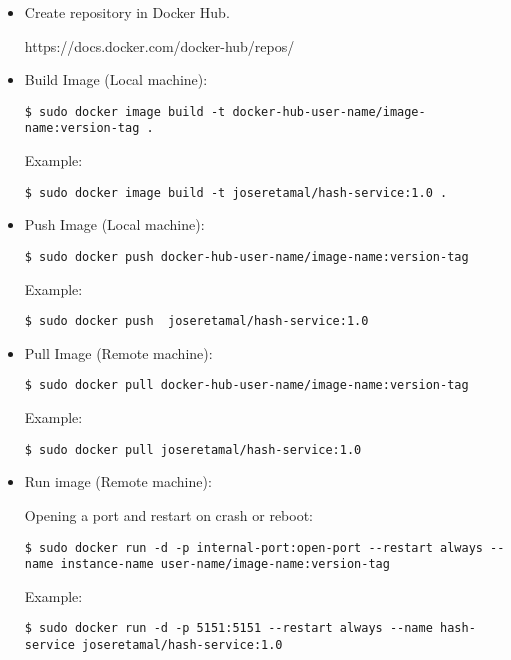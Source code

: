 \begin{itemize}
\item  Create repository in Docker Hub.

https://docs.docker.com/docker-hub/repos/
\item  Build Image (Local machine):
	
\begin{verbatim}
$ sudo docker image build -t docker-hub-user-name/image-name:version-tag .  
\end{verbatim}
Example:
\begin{verbatim}
$ sudo docker image build -t joseretamal/hash-service:1.0 . 
\end{verbatim}

\item  Push Image (Local machine):

\begin{verbatim}
$ sudo docker push docker-hub-user-name/image-name:version-tag
\end{verbatim}

Example:
\begin{verbatim}
$ sudo docker push  joseretamal/hash-service:1.0  
\end{verbatim}

\item  Pull Image (Remote machine):

\begin{verbatim}
$ sudo docker pull docker-hub-user-name/image-name:version-tag  
\end{verbatim}

Example:
\begin{verbatim}
$ sudo docker pull joseretamal/hash-service:1.0  
\end{verbatim}

\item  Run image (Remote machine):

\subitem Opening a port and restart on crash or reboot:
\begin{verbatim}
$ sudo docker run -d -p internal-port:open-port --restart always --name instance-name user-name/image-name:version-tag  
\end{verbatim}
Example:
\begin{verbatim}
$ sudo docker run -d -p 5151:5151 --restart always --name hash-service joseretamal/hash-service:1.0  
\end{verbatim}


\end{itemize}
